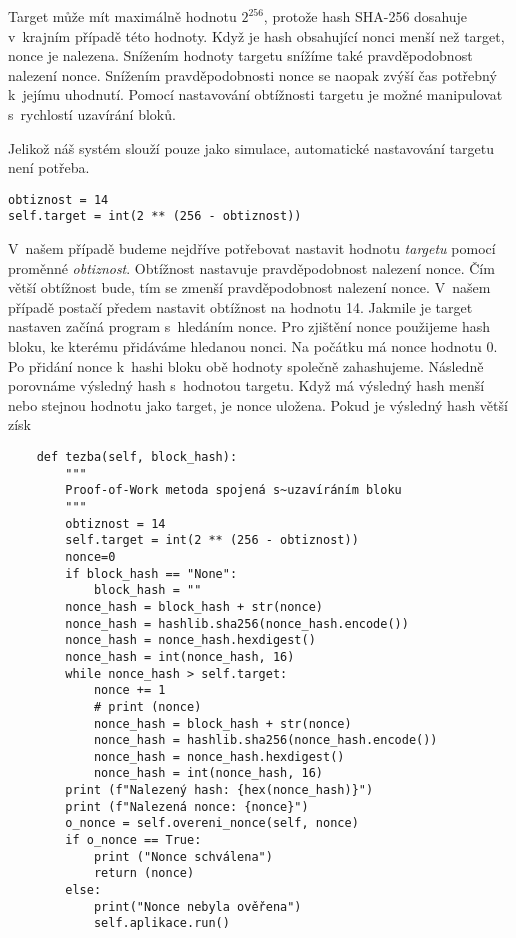 \documentclass[12pt]{report}			%
\begin{document}
{{Target může mít maximálně hodnotu  $2^{256}$, protože hash SHA-256 dosahuje v~krajním případě této hodnoty. Když je hash obsahující nonci menší než target, nonce je nalezena. Snížením hodnoty targetu snížíme také pravděpodobnost nalezení nonce. Snížením pravděpodobnosti nonce se naopak zvýší čas potřebný k~jejímu uhodnutí. Pomocí nastavování obtížnosti targetu je možné manipulovat s~rychlostí uzavírání bloků.

Jelikož náš systém slouží pouze jako simulace, automatické nastavování targetu není potřeba. 
\begin{lstlisting}
obtiznost = 14
self.target = int(2 ** (256 - obtiznost))
\end{lstlisting}

V~našem případě budeme nejdříve potřebovat nastavit hodnotu \textit{targetu} pomocí proměnné \textit{obtiznost}. Obtížnost nastavuje pravděpodobnost nalezení nonce. Čím větší obtížnost bude, tím se zmenší pravděpodobnost nalezení nonce. V~našem případě postačí předem nastavit obtížnost na hodnotu 14. Jakmile je target nastaven začíná program s~hledáním nonce. Pro zjištění nonce použijeme hash bloku, ke kterému přidáváme hledanou nonci. Na počátku má nonce hodnotu 0. Po přidání nonce k~hashi bloku obě hodnoty společně zahashujeme. Následně porovnáme výsledný hash s~hodnotou targetu. Když má výsledný hash menší nebo stejnou hodnotu jako target, je nonce uložena. Pokud je výsledný hash větší získ
\begin{lstlisting} 
	def tezba(self, block_hash):
        """
        Proof-of-Work metoda spojená s~uzavíráním bloku
        """
        obtiznost = 14
        self.target = int(2 ** (256 - obtiznost))
        nonce=0
        if block_hash == "None":
            block_hash = ""
        nonce_hash = block_hash + str(nonce)
        nonce_hash = hashlib.sha256(nonce_hash.encode())
        nonce_hash = nonce_hash.hexdigest()
        nonce_hash = int(nonce_hash, 16)
        while nonce_hash > self.target:
            nonce += 1
            # print (nonce)
            nonce_hash = block_hash + str(nonce)
            nonce_hash = hashlib.sha256(nonce_hash.encode())
            nonce_hash = nonce_hash.hexdigest()
            nonce_hash = int(nonce_hash, 16)           
        print (f"Nalezený hash: {hex(nonce_hash)}")
        print (f"Nalezená nonce: {nonce}")
        o_nonce = self.overeni_nonce(self, nonce)
        if o_nonce == True:
            print ("Nonce schválena")
            return (nonce)
        else:
            print("Nonce nebyla ověřena")
            self.aplikace.run()
\end{lstlisting}
}
}
\end{document}
